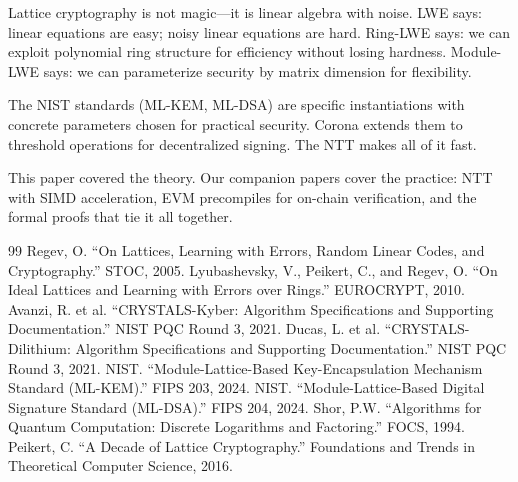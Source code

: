 \documentclass[11pt,a4paper]{article}
\begin{document}
Lattice cryptography is not magic---it is linear algebra with noise. LWE says: linear
equations are easy; noisy linear equations are hard. Ring-LWE says: we can exploit
polynomial ring structure for efficiency without losing hardness. Module-LWE says: we
can parameterize security by matrix dimension for flexibility.

The NIST standards (ML-KEM, ML-DSA) are specific instantiations with concrete parameters
chosen for practical security. Corona extends them to threshold operations for
decentralized signing. The NTT makes all of it fast.

This paper covered the theory. Our companion papers cover the practice: NTT with SIMD
acceleration, EVM precompiles for on-chain verification, and the formal proofs that
tie it all together.

\begin{thebibliography}{99}
 Regev, O. ``On Lattices, Learning with Errors, Random Linear Codes, and Cryptography.'' STOC, 2005.
 Lyubashevsky, V., Peikert, C., and Regev, O. ``On Ideal Lattices and Learning with Errors over Rings.'' EUROCRYPT, 2010.
 Avanzi, R. et al. ``CRYSTALS-Kyber: Algorithm Specifications and Supporting Documentation.'' NIST PQC Round 3, 2021.
 Ducas, L. et al. ``CRYSTALS-Dilithium: Algorithm Specifications and Supporting Documentation.'' NIST PQC Round 3, 2021.
 NIST. ``Module-Lattice-Based Key-Encapsulation Mechanism Standard (ML-KEM).'' FIPS 203, 2024.
 NIST. ``Module-Lattice-Based Digital Signature Standard (ML-DSA).'' FIPS 204, 2024.
 Shor, P.W. ``Algorithms for Quantum Computation: Discrete Logarithms and Factoring.'' FOCS, 1994.
 Peikert, C. ``A Decade of Lattice Cryptography.'' Foundations and Trends in Theoretical Computer Science, 2016.
\end{thebibliography}
\end{document}
